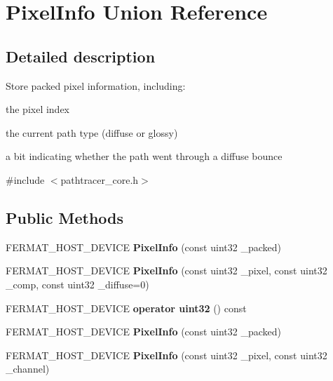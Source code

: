 \hypertarget{union_pixel_info}{}\section{Pixel\+Info Union Reference}
\label{union_pixel_info}


\subsection{Detailed description}
Store packed pixel information, including\+:
\begin{DoxyItemize}
\item the pixel index
\item the current path type (diffuse or glossy)
\item a bit indicating whether the path went through a diffuse bounce 
\end{DoxyItemize}

{\ttfamily \#include $<$pathtracer\+\_\+core.\+h$>$}

\subsection*{Public Methods}
\begin{DoxyCompactItemize}
\item 
\mbox{\label{union_pixel_info_a2808405cb466ebf0eeec02c5a6193f8a}} 
F\+E\+R\+M\+A\+T\+\_\+\+H\+O\+S\+T\+\_\+\+D\+E\+V\+I\+CE {\bfseries Pixel\+Info} (const uint32 \+\_\+packed)
\item 
\mbox{\label{union_pixel_info_a8d9e9bdd9d6e2cb960ef18b27e0ca2d0}} 
F\+E\+R\+M\+A\+T\+\_\+\+H\+O\+S\+T\+\_\+\+D\+E\+V\+I\+CE {\bfseries Pixel\+Info} (const uint32 \+\_\+pixel, const uint32 \+\_\+comp, const uint32 \+\_\+diffuse=0)
\item 
\mbox{\label{union_pixel_info_ab0c8785ed0f1f2e80fc4c6b245e9ba5a}} 
F\+E\+R\+M\+A\+T\+\_\+\+H\+O\+S\+T\+\_\+\+D\+E\+V\+I\+CE {\bfseries operator uint32} () const
\item 
\mbox{\label{union_pixel_info_a2808405cb466ebf0eeec02c5a6193f8a}} 
F\+E\+R\+M\+A\+T\+\_\+\+H\+O\+S\+T\+\_\+\+D\+E\+V\+I\+CE {\bfseries Pixel\+Info} (const uint32 \+\_\+packed)
\item 
\mbox{\label{union_pixel_info_a090a4d707252d2619143308e61bc85a6}} 
F\+E\+R\+M\+A\+T\+\_\+\+H\+O\+S\+T\+\_\+\+D\+E\+V\+I\+CE {\bfseries Pixel\+Info} (const uint32 \+\_\+pixel, const uint32 \+\_\+channel)
\end{DoxyCompactItemize}
